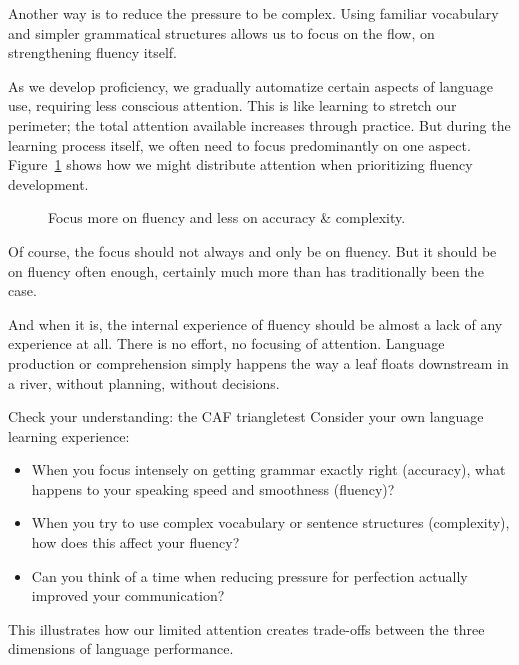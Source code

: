 Another way is to reduce the pressure to be complex. Using familiar vocabulary and simpler grammatical structures allows us to focus on the flow, on strengthening fluency itself. 

As we develop proficiency, we gradually automatize certain aspects of language use, requiring less conscious attention. This is like learning to stretch our perimeter; the total attention available increases through practice. But during the learning process itself, we often need to focus predominantly on one aspect. Figure~\ref{fig:CAFtriangle2} shows how we might distribute attention when prioritizing fluency development.

\begin{figure}
\caption{Focus more on fluency and less on accuracy \& complexity.}
\label{fig:CAFtriangle2}
\end{figure}

Of course, the focus should not always and only be on fluency. But it should be on fluency often enough, certainly much more than has traditionally been the case.

And when it is, the internal experience of fluency should be almost a lack of any experience at all. There is no effort, no focusing of attention. Language production or comprehension simply happens the way a leaf floats downstream in a river, without planning, without decisions.

\begin{tblsframedsymbol}{Check your understanding: the CAF triangle}{test}
Consider your own language learning experience:
\begin{itemize}[noitemsep, leftmargin=*]
    \item When you focus intensely on getting grammar exactly right (accuracy), what happens to your speaking speed and smoothness (fluency)?
    \item When you try to use complex vocabulary or sentence structures (complexity), how does this affect your fluency?
    \item Can you think of a time when reducing pressure for perfection actually improved your communication?
\end{itemize}
This illustrates how our limited attention creates trade-offs between the three dimensions of language performance.
\end{tblsframedsymbol}

